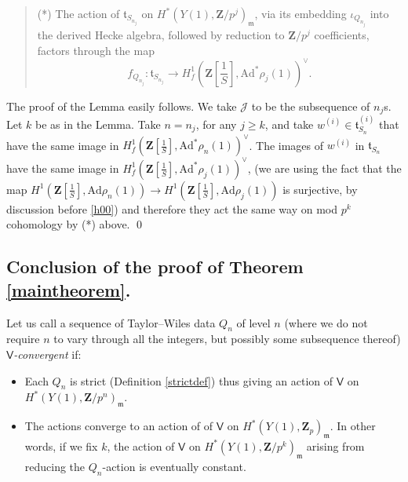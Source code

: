 \documentclass[10pt]{amsart}
\newcommand{\Z}{\mathbf{Z}}
\newcommand{\Ad}{\mathrm{Ad}}
\newcommand{\Vinf}{\mathsf{V}}
\newcommand{\ramprimes}{S}
\theoremstyle{remark}
\begin{document}
 \begin{quote} (*)  The action of  $\mathfrak{t}_{S_{n_j}}$   
on $H^*(Y(1), \Z/p^j)_{\mathfrak{m}}$, 
via its embedding $\iota_{Q_{n_j}}$  into the derived Hecke algebra,  followed by reduction to $\Z/p^j$ coefficients, 
factors through the map
$$ f_{Q_{n_j}} :  \mathfrak{t}_{S_{n_j}} \rightarrow H^1_f(\Z[\frac{1}{\ramprimes}], \Ad^* \rho_j(1))^{\vee}.$$
\end{quote}
 
The proof  of the Lemma easily follows. We take $\mathcal{J}$ to be the subsequence of $n_j$s.  Let $k$ be as in the Lemma.
Take $n= n_j$, for any $j \geq k$,  and take $w^{(i)} \in \mathfrak{t}_{S_n}^{(i)}$ that have the same image in  $H^1_f(\Z[\frac{1}{S}], \Ad^* \rho_n(1))^{\vee}$.  
%
The images of $w^{(i)}$ in $\mathfrak{t}_{S_n}$ have the same image in $H^1_f(\Z[\frac{1}{S}], \Ad^* \rho_j(1))^{\vee}$, 
 (we are using the fact that the map  $H^1(\Z[\frac{1}{S}], \Ad \rho_n(1)) \rightarrow H^1(\Z[\frac{1}{S}], \Ad \rho_j (1))$ is surjective, by discussion  before \eqref{h00}) and therefore they act the same way on mod $p^k$ cohomology by  (*) above. 
 \qed 
 
 
 \subsection{Conclusion of the proof of  Theorem \ref{maintheorem}. } \label{finalesec}  
 
 \label{DDR REF3} 
 Let us call a sequence of Taylor--Wiles data $Q_n$ of level $n$ (where we do not 
 require $n$ to vary through all the integers, but possibly some subsequence thereof)
 {\em $\Vinf$-convergent} if: \index{$\Vinf$-convergent} 
 \begin{itemize} 
 \item Each $Q_n$ is strict (Definition \ref{strictdef}) thus giving an action of $\Vinf$ on $H^*(Y(1), \Z/p^n)_{\mathfrak{m}}$. 
 \item The actions  converge to  an action of of $\Vinf$ on $H^*(Y(1), \Z_p)_{\mathfrak{m}}$.
In other words, if we fix $k$,  the action of $\Vinf$ on $H^*(Y(1), \Z/p^k)_{\mathfrak{m}}$ 
 arising from reducing the $Q_n$-action   is eventually constant.
 
 \end{itemize}
 
 
 
 
%
%
%
%
%
%
%
%
%
%
%
%
%
%
%
%
%
\end{document}
